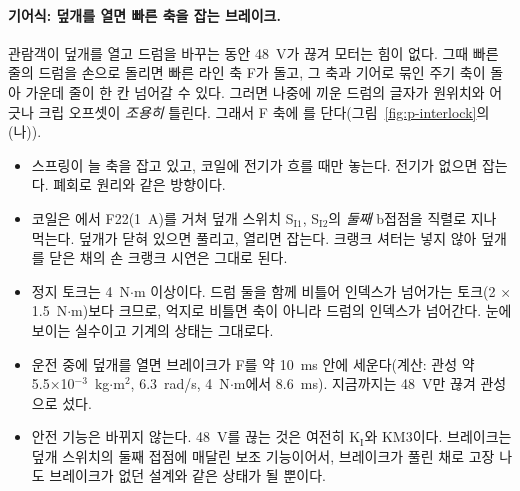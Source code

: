 \paragraph{기어식: 덮개를 열면 빠른 축을 잡는 브레이크.} 관람객이 덮개를 열고 드럼을 바꾸는 동안 48~V가 끊겨 모터는 힘이 없다. 그때
빠른 줄의 드럼을 손으로 돌리면 빠른 라인 축 F가 돌고, 그 축과 기어로 묶인 주기 축이 돌아 가운데 줄이 한 칸 넘어갈 수 있다. 그러면
나중에 끼운 드럼의 글자가 원위치와 어긋나 크립 오프셋이 \emph{조용히} 틀린다. 그래서 F 축에 를 단다(그림~\ref{fig:p-interlock}의 (나)).
\begin{itemize}
\item 스프링이 늘 축을 잡고 있고, 코일에 전기가 흐를 때만 놓는다. 전기가 없으면 잡는다. 폐회로 원리와 같은 방향이다.
\item 코일은 에서 F22(1~A)를 거쳐 덮개 스위치 S$_\mathrm{I1}$, S$_\mathrm{I2}$의 \emph{둘째} b접점을 직렬로 지나 먹는다.
덮개가 닫혀 있으면 풀리고, 열리면 잡는다. 크랭크 셔터는 넣지 않아 덮개를 닫은 채의 손 크랭크 시연은 그대로 된다.
\item 정지 토크는 4~N$\cdot$m 이상이다. 드럼 둘을 함께 비틀어 인덱스가 넘어가는 토크(2 × 1.5~N$\cdot$m)보다 크므로, 억지로 비틀면 축이
아니라 드럼의 인덱스가 넘어간다. 눈에 보이는 실수이고 기계의 상태는 그대로다.
\item 운전 중에 덮개를 열면 브레이크가 F를 약 10~ms 안에 세운다(계산: 관성 약 5.5×10$^{-3}$~kg$\cdot$m$^2$, 6.3~rad/s, 4~N$\cdot$m에서
8.6~ms). 지금까지는 48~V만 끊겨 관성으로 섰다.
\item 안전 기능은 바뀌지 않는다. 48~V를 끊는 것은 여전히 K$_\mathrm{I}$와 KM3이다. 브레이크는 덮개 스위치의 둘째 접점에 매달린 보조
기능이어서, 브레이크가 풀린 채로 고장 나도 브레이크가 없던 설계와 같은 상태가 될 뿐이다.
\end{itemize}

